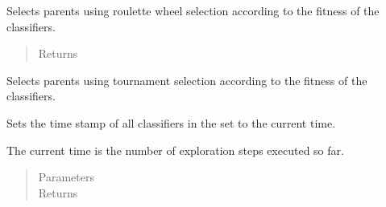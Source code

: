 \documentclass[letterpaper,10pt,english]{sphinxmanual}
\begin{document}
\begin{fulllineitems}
\begin{fulllineitems}
\label{\detokenize{eLCS:eLCS.ClassifierSet.ClassifierSet.selectClassifierRW}}
Selects parents using roulette wheel selection according to the fitness of the classifiers.
\begin{quote}\begin{description}
\item[{Returns}] \leavevmode


\end{description}\end{quote}

\end{fulllineitems}


\begin{fulllineitems}
\label{\detokenize{eLCS:eLCS.ClassifierSet.ClassifierSet.selectClassifierT}}
Selects parents using tournament selection according to the fitness of the classifiers.

\end{fulllineitems}


\begin{fulllineitems}
\label{\detokenize{eLCS:eLCS.ClassifierSet.ClassifierSet.setIterStamps}}
Sets the time stamp of all classifiers in the set to the current time.

The current time is the number of exploration steps executed so far.
\begin{quote}\begin{description}
\item[{Parameters}] \leavevmode
{} \textendash{} 

\item[{Returns}] \leavevmode


\end{description}\end{quote}

\end{fulllineitems}



\end{fulllineitems}
\end{document}
